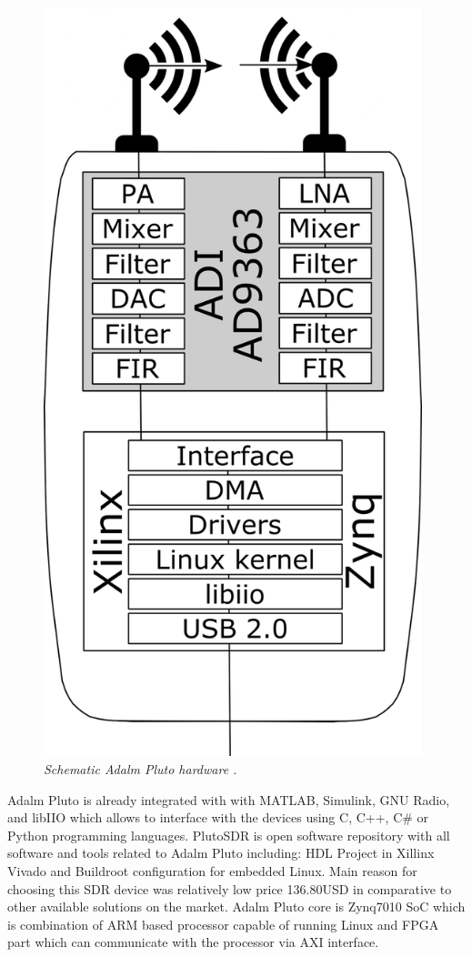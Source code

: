 \documentclass[en,printmode]{mgr}
\begin{document}
			\begin{figure}[!htb]
    			\centering
   				\includegraphics[width=11cm]{images/pluto_schematic.png}
   		 		\caption{\textit{Schematic Adalm Pluto hardware \cite{pluto_scheamtic}.}}
			\end{figure}
			
			Adalm Pluto is already integrated with with MATLAB, Simulink, GNU Radio, and libIIO which
			allows to interface with the devices using C, C++, C\# or Python programming languages.
			PlutoSDR is open software repository with all software and tools related to Adalm Pluto
			including: HDL Project in Xillinx Vivado and Buildroot configuration for embedded Linux.
			Main reason for choosing this SDR device was relatively low price 136.80USD 
			in comparative to other
			available solutions on the market. Adalm Pluto core is 			
			Zynq7010 SoC which is combination of ARM based processor capable of running Linux and
			FPGA part which can communicate with the processor via AXI interface.
\end{document}
